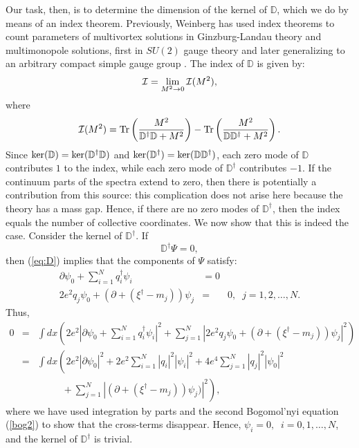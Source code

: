 \documentclass[a4paper,preprint,preprintnumbers,amsmath,amssymb]{revtex4}
\begin{document}
Our task, then, is to determine the dimension of the kernel of 
$\mathbb{D}$, which we do by means of an index theorem.
Previously, Weinberg has used index theorems to count
parameters of multivortex solutions in Ginzburg-Landau theory
\cite{ejw79a} and multimonopole solutions, first in $SU(2)$ gauge theory and 
later generalizing to an arbitrary compact simple gauge group 
\cite{ejw79,ejw80}.
The index of $\mathbb{D}$ is given by:
\begin{equation}
  {\cal I} = \lim_{M^2 \rightarrow 0} {\cal I}(M^2), 
\end{equation}
where
\begin{equation}
  {\cal	I}(M^2) 
  = \hbox{Tr} \left( \frac{M^2}{\mathbb{D}^\dagger \mathbb{D} + M^2} 
              \right)
  - \hbox{Tr} \left( \frac{M^2}{\mathbb{D} \mathbb{D}^\dagger + M^2} 
              \right).
   \label{eq:indexM}
\end{equation}
Since $\hbox{ker}(\mathbb{D}) = \hbox{ker}(\mathbb{D}^\dagger \mathbb{D})$ 
and  
$\hbox{ker}(\mathbb{D}^\dagger) = \hbox{ker}(\mathbb{D} \mathbb{D}^\dagger)$,
each zero mode of $\mathbb{D}$ contributes $1$ to the index,
while each zero mode of $\mathbb{D}^\dagger$ contributes $-1$.
If the continuum parts of the spectra extend to zero, then there is 
potentially a contribution from this source: this complication does not 
arise here because the theory has a mass gap.
Hence, if there are no zero modes of $\mathbb{D}^\dagger$, then the index 
equals the number of collective coordinates. We now show that this is
indeed the case. Consider the kernel of $ \mathbb{D}^\dagger $. 
If
\begin{equation}
    \mathbb{D}^\dagger \Psi = 0, 
\end{equation}
then (\ref{eq:D}) implies that the components of $\Psi$ satisfy:
\begin{eqnarray}
\partial \psi_0 + \sum_{i=1}^{N} q_{i}^{\dagger} \psi_i & = 0 
   \nonumber \\
2e^2 q_j \psi_0 + (\partial + (\xi^\dagger - m_j))\psi_j & = & 0, \;\;
  j = 1, 2, \ldots, N.
\end{eqnarray}
Thus,
\begin{eqnarray}
0 & = &  \int dx \left( 
      2e^2 |\partial \psi_0 + \sum_{i=1}^{N} q_{i}^{\dagger} \psi_i |^2
    + \sum_{j=1}^{N} 
      | 2e^2 q_j \psi_0 + (\partial + (\xi^\dagger - m_j))\psi_j |^2
          \right)
   \nonumber \\
  & = &  \int dx \left( 2e^2 | \partial \psi_0 |^2 
       + 2e^2 \sum_{i=1}^{N} |q_i|^2 |\psi_i|^2
       + 4e^4 \sum_{j=1}^{N} |q_j|^2 |\psi_0|^2
    \right. \nonumber \\
  & & \;\; \left.
      \quad\quad 
       + \sum_{j=1}^{N} | (\partial + (\xi^\dagger - m_j))\psi_j) |^2
   \right),
\end{eqnarray}
where we have used integration by parts and the second Bogomol'nyi
equation (\ref{bog2}) to show that the cross-terms disappear.
Hence, $\psi_i = 0, \;\; i = 0, 1, \ldots, N$, and the kernel of
$\mathbb{D}^\dagger$ is trivial. 
\end{document}
